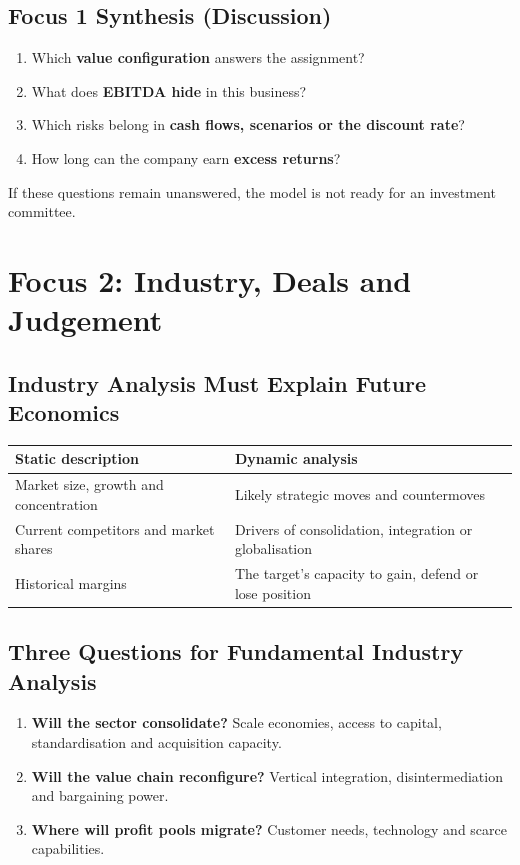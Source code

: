 \subsection{Focus 1 Synthesis (Discussion)}
\begin{enumerate}
  \item Which \textbf{value configuration} answers the assignment?
  \item What does \textbf{EBITDA hide} in this business?
  \item Which risks belong in \textbf{cash flows, scenarios or the discount rate}?
  \item How long can the company earn \textbf{excess returns}?
\end{enumerate}
\begin{keybox}
If these questions remain unanswered, the model is not ready for an investment committee.
\end{keybox}

\section{Focus 2: Industry, Deals and Judgement}

\subsection{Industry Analysis Must Explain Future Economics}
\begin{center}
\small
\begin{tabular}{@{}p{7cm}p{7cm}@{}}
\toprule
\textbf{Static description} & \textbf{Dynamic analysis}\\
\midrule
Market size, growth and concentration & Likely strategic moves and countermoves\\
Current competitors and market shares & Drivers of consolidation, integration or globalisation\\
Historical margins & The target's capacity to gain, defend or lose position\\
\bottomrule
\end{tabular}
\end{center}

\subsection{Three Questions for Fundamental Industry Analysis}
\begin{enumerate}
  \item \textbf{Will the sector consolidate?} Scale economies, access to capital, standardisation and acquisition capacity.
  \item \textbf{Will the value chain reconfigure?} Vertical integration, disintermediation and bargaining power.
  \item \textbf{Where will profit pools migrate?} Customer needs, technology and scarce capabilities.
\end{enumerate}

